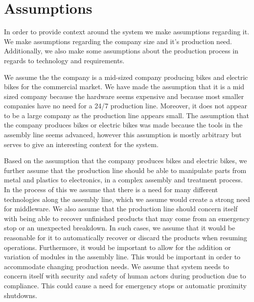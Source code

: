 \section{Assumptions}
In order to provide context around the system we make assumptions regarding it. We make assumptions regarding the company size and it's production need. Additionally, we also make some assumptions about the production process in regards to technology and requirements.

We assume the the company is a mid-sized company producing bikes and electric bikes for the commercial market. We have made the assumption that it is a mid sized company because the hardware seems expensive and because most smaller companies have no need for a 24/7 production line. Moreover, it does not appear to be a large company as the production line appears small. The assumption that the company produces bikes or electric bikes was made because the tools in the assembly line seems advanced, however this assumption is mostly arbitrary but serves to give an interesting context for the system.

Based on the assumption that the company produces bikes and electric bikes, we further assume that the production line should be able to manipulate parts from metal and plastics to electronics, in a complex assembly and treatment process. In the process of this we assume that there is a need for many different technologies along the assembly line, which we assume would create a strong need for middleware.
We also assume that the production line should concern itself with being able to recover unfinished products that may come from an emergency stop or an unexpected breakdown. In such cases, we assume that it would be reasonable for it to automatically recover or discard the products when resuming operations.
Furthermore, it would be important to allow for the addition or variation of modules in the assembly line. This would be important in order to accommodate changing production needs.
We assume that  system needs to concern itself with security and safety of human actors during production due to compliance. This could cause a need for emergency stops or automatic proximity shutdowns.
